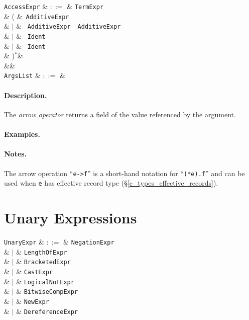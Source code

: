 \begin{syntax}
  \verb+AccessExpr+ & $::=$ & \verb+TermExpr+\\
   &  \big( &\token{[}\ \verb+AdditiveExpr+\ \token{]}\\
   & $|$ & \token{[}\ \verb+AdditiveExpr+\ \ \verb+AdditiveExpr+\ \token{]}\\
   & $|$ & \ \verb+Ident+\ \\
   & $|$ & \token{->}\ \verb+Ident+\ \\
   & \big)$^*$&\\
&&\\
\verb+ArgsList+ & $::=$ & \\
\end{syntax}

\paragraph{Description.}

The {\em arrow operator} returns a field of the value referenced by the argument.

\paragraph{Examples.}

\paragraph{Notes.} The arrow operation ``\lstinline{e->f}'' is a short-hand notation for ``\lstinline{(*e).f}'' and can be used when \lstinline{e} has effective record type (\S\ref{c_types_effective_records}).


\section{Unary Expressions}
\label{c_expr_term}

\begin{syntax}
  \verb+UnaryExpr+ & $::=$ & \verb+NegationExpr+\\
  & $|$ & \verb+LengthOfExpr+\\
  & $|$ & \verb+BracketedExpr+\\
  & $|$ & \verb+CastExpr+\\
  & $|$ & \verb+LogicalNotExpr+\\
  & $|$ & \verb+BitwiseCompExpr+\\
  & $|$ & \verb+NewExpr+\\
  & $|$ & \verb+DereferenceExpr+\\
\end{syntax}

